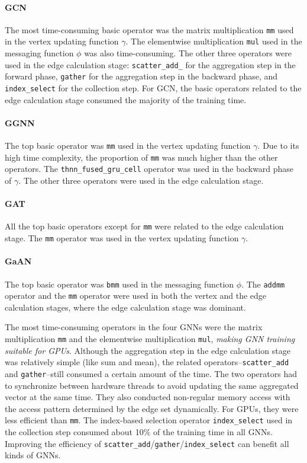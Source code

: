 \paragraph{GCN}
%
The most time-consuming basic operator was the matrix multiplication \texttt{mm} used in the vertex updating function $\gamma$.
%
The elementwise multiplication \texttt{mul} used in the messaging function $\phi$ was also time-consuming.
%
The other three operators were used in the edge calculation stage: \texttt{scatter\_add\_} for the aggregation step in the forward phase, \texttt{gather} for the aggregation step in the backward phase, and \texttt{index\_select} for the collection step.
%
For GCN, the basic operators related to the edge calculation stage consumed the majority of the training time.

\paragraph{GGNN}
%
The top basic operator was \texttt{mm} used in the vertex updating function $\gamma$.
%
Due to its high time complexity, the proportion of \texttt{mm} was much higher than the other operators.
%
The \texttt{thnn\_fused\_gru\_cell} operator was used in the backward phase of $\gamma$.
%
The other three operators were used in the edge calculation stage.

\paragraph{GAT}
%
All the top basic operators except for \texttt{mm} were related to the edge calculation stage.
%
The \texttt{mm} operator was used in the vertex updating function $\gamma$.

\paragraph{GaAN}
%
The top basic operator was \texttt{bmm} used in the messaging function $\phi$.
%
The \texttt{addmm} operator and the \texttt{mm} operator were used in both the vertex and the edge calculation stages, where the edge calculation stage was dominant.

The most time-consuming operators in the four GNNs were the matrix multiplication \texttt{mm} and the elementwise multiplication \texttt{mul}, \emph{making GNN training suitable for GPUs}.
%
Although the aggregation step in the edge calculation stage was relatively simple (like sum and mean), the related operators--\texttt{scatter\_add} and \texttt{gather}--still consumed a certain amount of the time.
%
The two operators had to synchronize between hardware threads to avoid updating the same aggregated vector at the same time.
%
They also conducted non-regular memory access with the access pattern determined by the edge set dynamically.
%
For GPUs, they were less efficient than \texttt{mm}.
%
The index-based selection operator \texttt{index\_select} used in the collection step consumed about 10\% of the training time in all GNNs.
%
Improving the efficiency of \texttt{scatter\_add}/\texttt{gather}/\texttt{index\_select} can benefit all kinds of GNNs.

